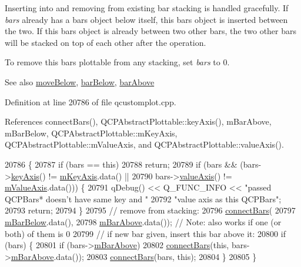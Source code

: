 Inserting into and removing from existing bar stacking is handled gracefully. If {\itshape bars} already has a bars object below itself, this bars object is inserted between the two. If this bars object is already between two other bars, the two other bars will be stacked on top of each other after the operation.

To remove this bars plottable from any stacking, set {\itshape bars} to 0.

\begin{DoxySeeAlso}{See also}
\hyperlink{class_q_c_p_bars_a69fc371346980f19177c3d1ecdad78ee}{move\+Below}, \hyperlink{class_q_c_p_bars_a2c46a686cbad95f180ca3c2e88263961}{bar\+Below}, \hyperlink{class_q_c_p_bars_a9ca48a6577586825d85bdc1fbf410803}{bar\+Above} 
\end{DoxySeeAlso}


Definition at line 20786 of file qcustomplot.\+cpp.



References connect\+Bars(), Q\+C\+P\+Abstract\+Plottable\+::key\+Axis(), m\+Bar\+Above, m\+Bar\+Below, Q\+C\+P\+Abstract\+Plottable\+::m\+Key\+Axis, Q\+C\+P\+Abstract\+Plottable\+::m\+Value\+Axis, and Q\+C\+P\+Abstract\+Plottable\+::value\+Axis().


\begin{DoxyCode}
20786                                      \{
20787   \textcolor{keywordflow}{if} (bars == \textcolor{keyword}{this})
20788     \textcolor{keywordflow}{return};
20789   \textcolor{keywordflow}{if} (bars && (bars->\hyperlink{class_q_c_p_abstract_plottable_a72c7a09c22963f2c943f07112b311103}{keyAxis}() != \hyperlink{class_q_c_p_abstract_plottable_a426f42e254d0f8ce5436a868c61a6827}{mKeyAxis}.data() ||
20790                bars->\hyperlink{class_q_c_p_abstract_plottable_a3106f9d34d330a6097a8ec5905e5b519}{valueAxis}() != \hyperlink{class_q_c_p_abstract_plottable_a2901452ca4aea911a1827717934a4bda}{mValueAxis}.data())) \{
20791     qDebug() << Q\_FUNC\_INFO << \textcolor{stringliteral}{"passed QCPBars* doesn't have same key and "}
20792                                \textcolor{stringliteral}{"value axis as this QCPBars"};
20793     \textcolor{keywordflow}{return};
20794   \}
20795   \textcolor{comment}{// remove from stacking:}
20796   \hyperlink{class_q_c_p_bars_a6ea37802cd22f97235cab614b14b9f19}{connectBars}(
20797       \hyperlink{class_q_c_p_bars_ad51db970eed7e286f2753b0216fc56de}{mBarBelow}.data(),
20798       \hyperlink{class_q_c_p_bars_a0c1c46076c41a478dbb373cfd35929aa}{mBarAbove}.data()); \textcolor{comment}{// Note: also works if one (or both) of them is 0}
20799   \textcolor{comment}{// if new bar given, insert this bar above it:}
20800   \textcolor{keywordflow}{if} (bars) \{
20801     \textcolor{keywordflow}{if} (bars->\hyperlink{class_q_c_p_bars_a0c1c46076c41a478dbb373cfd35929aa}{mBarAbove})
20802       \hyperlink{class_q_c_p_bars_a6ea37802cd22f97235cab614b14b9f19}{connectBars}(\textcolor{keyword}{this}, bars->\hyperlink{class_q_c_p_bars_a0c1c46076c41a478dbb373cfd35929aa}{mBarAbove}.data());
20803     \hyperlink{class_q_c_p_bars_a6ea37802cd22f97235cab614b14b9f19}{connectBars}(bars, \textcolor{keyword}{this});
20804   \}
20805 \}
\end{DoxyCode}


